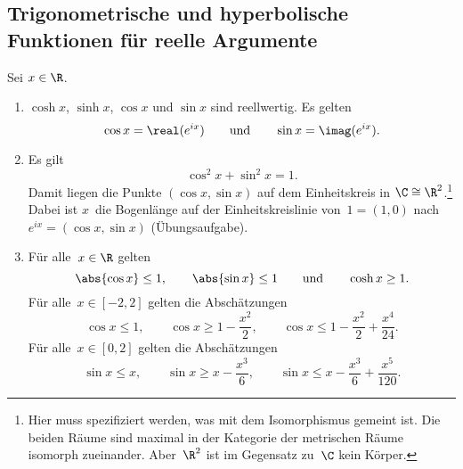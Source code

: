 \documentclass[a4paper]{article}
\begin{document}
\subsection{Trigonometrische und hyperbolische Funktionen für reelle Argumente}

\begin{proposition}
    Sei $x \in \R$.
    \begin{enumerate}
        \item $\cosh x$, $\sinh x$, $\cos x$ und $\sin x$ sind reellwertig. Es gelten
              \begin{equation*}
                  \cos x = \real(e^{ix}) \qquad\text{und}\qquad \sin x = \imag(e^{ix}).
              \end{equation*}\label{prop:trig:real:1}
        \item Es gilt
              \begin{equation*}
                  \cos^2x + \sin^2x = 1.
              \end{equation*}
              Damit liegen die Punkte $(\cos x,\sin x)$ auf dem Einheitskreis in $\C \cong \R^2$.\footnote{Hier muss spezifiziert werden, was mit dem Isomorphismus gemeint ist. Die beiden Räume sind maximal in der Kategorie der metrischen Räume isomorph zueinander. Aber~$\R^2$ ist im Gegensatz zu~$\C$ kein Körper.} Dabei ist $x$~die Bogenlänge auf der Einheitskreislinie von~$1 = (1, 0)$ nach $e^{ix} = (\cos x,\sin x)$ (Übungsaufgabe).\label{prop:trig:real:2}
        \item Für alle~$x \in \R$ gelten
              \begin{equation*}
                  \abs{\cos x} \leq 1, \qquad \abs{\sin x} \leq 1 \qquad\text{und}\qquad \cosh x \geq 1.
              \end{equation*}
              Für alle~$x \in [-2, 2]$ gelten die Abschätzungen
              \begin{equation*}
                  \cos x \leq 1, \qquad \cos x \geq 1-\frac{x^2}{2}, \qquad \cos x \leq 1 - \frac{x^2}{2} + \frac{x^4}{24}.
              \end{equation*}
              Für alle~$x \in [0, 2]$ gelten die Abschätzungen
              \begin{equation*}
                  \sin x \leq x, \qquad \sin x \geq x - \frac{x^3}{6}, \qquad \sin x \leq x - \frac{x^3}{6} + \frac{x^5}{120}.
              \end{equation*}\label{prop:trig:real:3}
    \end{enumerate}
\end{proposition}
\end{document}
